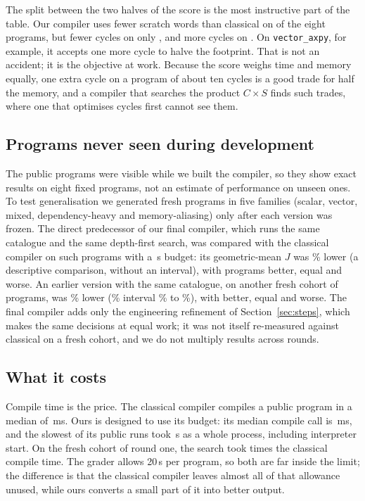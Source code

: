 \documentclass[11pt,a4paper]{article}
\begin{document}
The split between the two halves of the score is the most instructive part of the
table. Our compiler uses fewer scratch words than classical on  of the
eight programs, but fewer cycles on only , and more cycles on
. On \texttt{vector\_axpy}, for example, it accepts one more cycle to
halve the footprint. That is not an accident; it is the objective at work. Because
the score weighs time and memory equally, one extra cycle on a program of about ten
cycles is a good trade for half the memory, and a compiler that searches the product
$C\times S$ finds such trades, where one that optimises cycles first cannot see them.

\subsection{Programs never seen during development}
The public programs were visible while we built the compiler, so they show exact
results on eight fixed programs, not an estimate of performance on unseen ones. To
test generalisation we generated fresh programs in five families (scalar, vector,
mixed, dependency-heavy and memory-aliasing) only after each version was frozen.
The direct predecessor of our final compiler, which runs the same catalogue and the
same depth-first search, was compared with the classical compiler on 
such programs with a \,s budget: its geometric-mean $J$ was
\% lower (a descriptive comparison, without an interval), with  programs better,  equal and
 worse. An earlier version with the same catalogue, on another fresh
cohort of  programs, was \% lower (\% interval \% to
\%), with  better,  equal and 
worse. The final compiler adds only the engineering refinement of
Section~\ref{sec:steps}, which makes the same decisions at equal work; it was not
itself re-measured against classical on a fresh cohort, and we do not multiply
results across rounds.

\subsection{What it costs}
Compile time is the price. The classical compiler compiles a public program in a
median of \,ms. Ours is designed to use its budget: its median compile
call is \,ms, and the slowest of its  public runs took
\,s as a whole process, including interpreter start. On the fresh
cohort of round one, the search took  times the classical compile time.
The grader allows 20\,s per program, so both are far inside the limit; the
difference is that the classical compiler leaves almost all of that allowance
unused, while ours converts a small part of it into better output.
\end{document}
